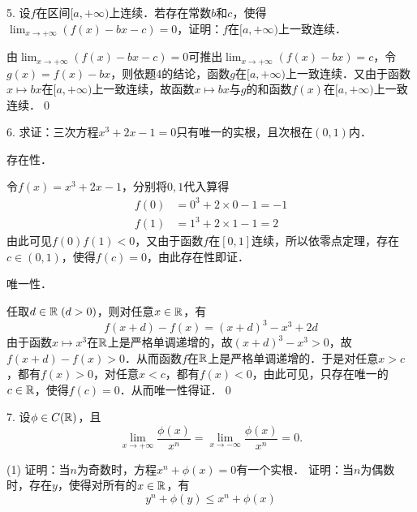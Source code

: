 5. 设$f$在区间$[a, +\infty)$上连续．若存在常数$b$和$c$，使得$\displaystyle\lim_{x \to +\infty} \left(f(x) - bx - c\right) = 0$，证明：$f$在$[a, +\infty)$上一致连续．

\prove 由$\displaystyle\lim_{x \to +\infty} (f(x) - bx - c) = 0$可推出$\displaystyle\lim_{x \to +\infty} (f(x) - bx) = c$，令$g(x) = f(x) - bx$，则依题4的结论，函数$g$在$[a, +\infty)$上一致连续．又由于函数$x \mapsto bx$在$[a, +\infty)$上一致连续，故函数$x \mapsto bx$与$g$的和函数$f(x)$在$[a, +\infty)$上一致连续．\qed\bigskip

6. 求证：三次方程$x^3 + 2x - 1 = 0$只有唯一的实根，且次根在$(0,1)$内．

\prove 

存在性．

令$f(x) = x^3 + 2x - 1$，分别将$0, 1$代入算得
\begin{align}
    f(0) &= 0^3 + 2\times 0 - 1 = -1 \\
    f(1) &= 1^3 + 2\times 1 - 1 = 2
\end{align}
由此可见$f(0)f(1) < 0$，又由于函数$f$在$[0,1]$连续，所以依零点定理，存在$c \in (0,1)$，使得$f(c) = 0$，由此存在性即证．

唯一性．

任取$d \in \mathbb{R} \; (d > 0)$，则对任意$x \in \mathbb{R}$，有
\begin{equation}
    f(x+d) - f(x) = (x+d)^3 - x^3 + 2d
\end{equation}
由于函数$x \mapsto x^3$在$\mathbb{R}$上是严格单调递增的，故$(x+d)^3-x^3>0$，故$f(x+d)-f(x)>0$．从而函数$f$在$\mathbb{R}$上是严格单调递增的．于是对任意$x > c$，都有$f(x) > 0$，对任意$x < c$，都有$f(x) < 0$，由此可见，只存在唯一的$c \in \mathbb{R}$，使得$f(c) = 0$．从而唯一性得证．\qed\bigskip

7. 设$\phi \in C(\mathbb{R})$，且
\begin{equation}
    \lim_{x \to +\infty} \frac{\phi(x)}{x^n} = \lim_{x \to -\infty} \frac{\phi(x)}{x^n} = 0.
\end{equation}

\begin{tasks}(1)
    \task 证明：当$n$为奇数时，方程$x^n + \phi(x) = 0$有一个实根．
    \task 证明：当$n$为偶数时，存在$y$，使得对所有的$x \in \mathbb{R}$，有
    \begin{equation*}
        y^n + \phi(y) \leq x^n + \phi(x)
    \end{equation*}
\end{tasks}


